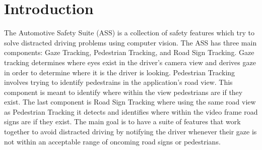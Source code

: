 \section{Introduction}


The Automotive Safety Suite (ASS) is a collection of safety features which try to solve distracted driving problems using computer vision. The ASS has three main components: Gaze Tracking, Pedestrian Tracking, and Road Sign Tracking. Gaze tracking determines where eyes exist in the driver's camera view and derives gaze in order to determine where it is the driver is looking. Pedestrian Tracking involves trying to identify pedestrains in the application's road view. This component is meant to identify where within the view pedestrians are if they exist. The last component is Road Sign Tracking where using the same road view as Pedestrian Tracking it detects and identifies where within the video frame road signs are if they exist. The main goal is to have a suite of features that work together to avoid distracted driving by notifying the driver whenever their gaze is not within an acceptable range of oncoming road signs or pedestrians.